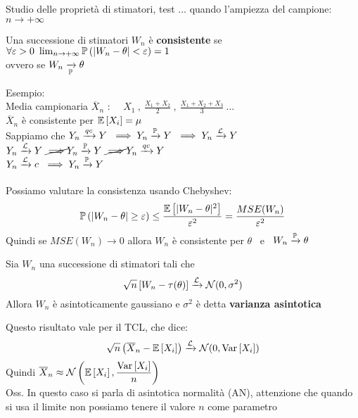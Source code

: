 

Studio delle proprietà di stimatori, test ... quando l'ampiezza del campione: $n\to+\infty$\\

\begin{defi}
Una successione di stimatori $W_n$ è \textbf{consistente} se \ $\forall \varepsilon >0 \ \lim_{n\to+\infty} \mathbb{P} \left(  |W_n-\theta|<\varepsilon  \right)=1 $\\ ovvero se $ W_n \xrightarrow[\mathbb P]{}\theta$
\end{defi}
\phantom{}

Esempio:\\
Media campionaria $\overline{X}_n$ : \ \ $X_1 \ , \ \frac{X_1+X_2}{2} \ , \ \frac{X_1+X_2+X_3}{3} \ ...$\\
$\overline{X}_n$ è consistente per $\mathbb{E} \left[ X_i \right]=\mu$\\


Sappiamo che $Y_n\xrightarrow{qc} Y\ \implies Y_n\xrightarrow{\mathbb P} Y  \ \implies Y_n \xrightarrow{\mathcal L} Y $\\
\phantom{Sappiamo che }$Y_n\xrightarrow{\Lc} Y \ \cancel{\implies}  Y_n\xrightarrow{\PP} Y \ \cancel{\implies}  Y_n\xrightarrow{qc} Y $
\\
\phantom{Sappiamo che }$Y_n\xrightarrow{\Lc} c \ \implies  Y_n\xrightarrow{\PP} Y$\\ \\


Possiamo valutare la consistenza usando Chebyshev:
\[
\mathbb{P} \left( |W_n - \theta|\ge \varepsilon \right) \le \dfrac{\mathbb{E} \left[ |W_n -\theta|^2 \right]}{\varepsilon^2}=\dfrac{MSE(W_n)}{\varepsilon^2}
\]
Quindi se $MSE(W_n) \to 0 $ allora $W_n$ è consistente per $\theta$  \ e \ $W_n\xrightarrow{\mathbb P}\theta$\\

\begin{defi}
    Sia $W_n$ una successione di stimatori tali che
    \[
    \sqrt{n}\left[ W_n -\tau(\theta) \right] \xrightarrow{\mathcal L} \mathcal N(0,\sigma^2)
    \]
    Allora $W_n$ è asintoticamente gaussiano e $\sigma^2$ è detta \textbf{varianza asintotica}
\end{defi}

Questo risultato vale per il TCL, che dice:
\[
\sqrt{n}\left(\overline{X}_n - \mathbb{E} \left[ X_i \right]\right) \xrightarrow{\mathcal L} \mathcal N(0,\text{Var} \left[ X_i \right])
\]
Quindi $\overline{X}_n \approx \mathcal N\left( \mathbb{E} \left[ X_i \right], \dfrac{\text{Var} \left[ X_i \right]}{n} \right)$\\
Oss. In questo caso si parla di asintotica normalità (AN), attenzione che quando si usa il limite non possiamo tenere il valore $n$ come parametro\\


